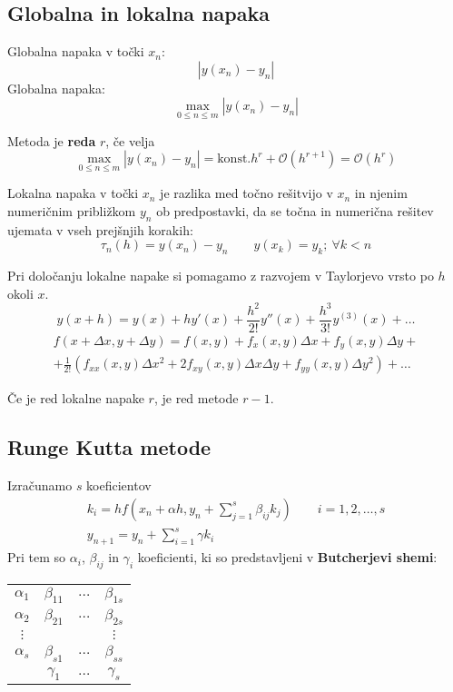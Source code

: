 \begin{multicols}{5}
\subsection*{Globalna in lokalna napaka}
Globalna napaka v točki $x_n$:
\[ |y(x_n) - y_n | \]
Globalna napaka:
\[\max_{0 \leq n \leq m} |y(x_n) - y_n |\]

Metoda je \textbf{reda} $r$, če velja
\[ \max_{0 \leq n \leq m} |y(x_n) - y_n| = \text{konst.} h^r + \mathcal{O}\left(h^{r+1}\right) = \mathcal{O}\left(h^r\right)\]

Lokalna napaka v točki $x_n$ je razlika med točno rešitvijo v $x_n$ in njenim numeričnim približkom $y_n$
ob predpostavki, da se točna in numerična rešitev ujemata v vseh prejšnjih korakih:
\[ \tau_n(h) = y(x_n) - y_n \qquad y(x_k) = y_k; \ \forall k < n\]

Pri določanju lokalne napake si pomagamo z razvojem v Taylorjevo vrsto po $h$ okoli $x$.
\[ y(x+h) = y(x) + hy'(x)+\frac{h^2}{2!}y''(x) + \frac{h^3}{3!}y^{(3)}(x) + \dots\]
\begin{multline*}
    f(x + \Delta x, y + \Delta y) = f(x,y) + f_x(x,y)\Delta x + f_y(x,y) \Delta y + \\
    + \frac{1}{2!}\left( f_{xx}(x,y)\Delta x^2 + 2 f_{xy}(x,y) \Delta x \Delta y + f_{yy}(x,y) \Delta y^2\right) + \dots
\end{multline*}

Če je red lokalne napake $r$, je red metode $r-1$.

\subsection*{Runge Kutta metode}
Izračunamo $s$ koeficientov
\begin{gather*}
    k_i = hf(x_n + \alpha h, y_n + \sum_{j=1}^s \beta_{ij} k_j) \qquad i = 1, 2, \dots, s \\
    y_{n+1} = y_n + \sum_{i=1}^s \gamma k_i
\end{gather*}
Pri tem so $\alpha_i$, $\beta_{ij}$ in $\gamma_i$ koeficienti, ki so predstavljeni v \textbf{Butcherjevi shemi}:
\begin{center}
    \begin{tabular}[]{c | c c c}
        $\alpha_1$ & $\beta_{11}$ & $\dots$ & $\beta_{1s}$ \\
        $\alpha_2$ & $\beta_{21}$ & $\dots$ & $\beta_{2s}$ \\
        $\vdots$ &                &         & $\vdots$ \\
        $\alpha_s$ & $\beta_{s1}$ & $\dots$ & $\beta_{ss}$ \\ \hline
                 & $\gamma_{1}$ & $\dots$ & $\gamma_{s}$ \\


\end{tabular}
\end{center}
\end{multicols}
